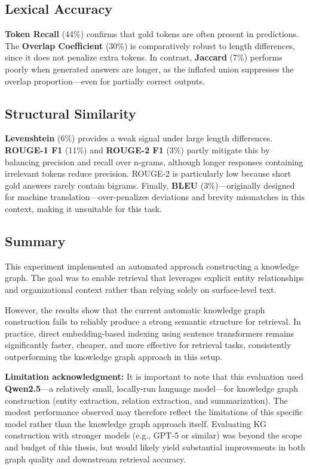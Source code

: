 \subsection{Lexical Accuracy}
	\textbf{Token Recall} (44\%) confirms that gold tokens are often present in predictions. The \textbf{Overlap Coefficient} (30\%) is comparatively robust to length differences, since it does not penalize extra tokens. In contrast, \textbf{Jaccard} (7\%) performs poorly when generated answers are longer, as the inflated union suppresses the overlap proportion—even for partially correct outputs.

\subsection{Structural Similarity}
	\textbf{Levenshtein} (6\%) provides a weak signal under large length differences. \textbf{ROUGE-1 F1} (11\%) and \textbf{ROUGE-2 F1} (3\%) partly mitigate this by balancing precision and recall over n-grams, although longer responses containing irrelevant tokens reduce precision. ROUGE-2 is particularly low because short gold answers rarely contain bigrams. Finally, \textbf{BLEU} (3\%)—originally designed for machine translation—over-penalizes deviations and brevity mismatches in this context, making it unsuitable for this task.

\subsection{Summary}
This experiment implemented an automated approach constructing a knowledge graph. The goal was to enable retrieval that leverages explicit entity relationships and organizational context rather than relying solely on surface-level text.

However, the results show that the current automatic knowledge graph construction fails to reliably produce a strong semantic structure for retrieval. In practice, direct embedding-based indexing using sentence transformers remains significantly faster, cheaper, and more effective for retrieval tasks, consistently outperforming the knowledge graph approach in this setup.

\textbf{Limitation acknowledgment:} It is important to note that this evaluation used \textbf{Qwen2.5}—a relatively small, locally-run language model—for knowledge graph construction (entity extraction, relation extraction, and summarization). The modest performance observed may therefore reflect the limitations of this specific model rather than the knowledge graph approach itself. Evaluating KG construction with stronger models (e.g., GPT-5 or similar) was beyond the scope and budget of this thesis, but would likely yield substantial improvements in both graph quality and downstream retrieval accuracy.


